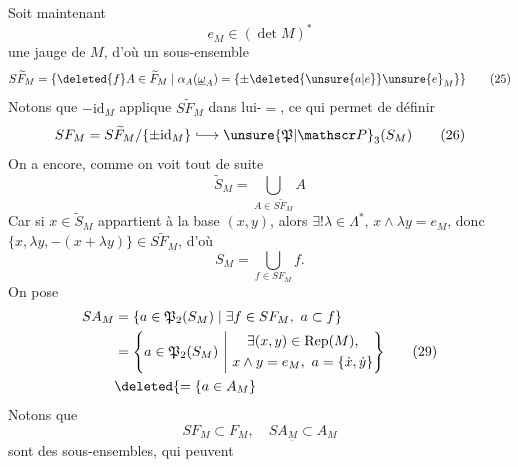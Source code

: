 Soit maintenant
\[
e_M\in(\det M)^*\tag*{(24)}
\]
une jauge de $M$, d'où un sous-ensemble
\[
S\widetilde F_M=\{\deleted{f}A\in\widetilde F_M\mid\alpha_A(\underline{\omega}_A)=\{\pm\deleted{\unsure{a|e}}\unsure{e}_M\}\}\tag*{(25)}
\]
Notons que $-\mathrm{id}_M$ applique $S\widetilde F_M$ dans lui-$=$, ce qui permet de définir
\[
SF_M=S\widetilde F_M/\{\pm\mathrm{id}_M\}\lhook\joinrel\longrightarrow\unsure{\mathfrak P|\mathscr P}_3(S_M)\tag*{(26)}
\]
On a encore, comme on voit tout de suite
\[
\widetilde S_M=\bigcup_{A\in S\widetilde F_M}A\tag*{(27)}
\]
Car si $x\in\widetilde S_M$ appartient à la base $(x,y)$, alors $\exists!\lambda\in\Lambda^*$,   $x\wedge\lambda y=e_M$, donc $\{x,\lambda y,-(x+\lambda y)\}\in S\widetilde F_M$, d'où
\[
S_M=\bigcup_{f\in SF_M}f.\tag*{(28)}
\]
On pose
\[
\begin{aligned}
SA_M&=\{a\in\mathfrak P_2(S_M)\mid\exists f\in SF_M,\ a\subset f\}\\
&=\left\{a\in\mathfrak P_2(S_M)\ \middle|\
\begin{gathered}\exists(x,y)\in\mathrm{Rep}(M),\\ x\wedge y=e_M,\ a=\{\dot x,\dot y\}\end{gathered}\right\}\\
&\deleted{=\{a\in A_M}
\end{aligned}\tag*{(29)}
\]
Notons que
\[
SF_M\subset F_M,\quad SA_{\underline M}\subset A_M\tag*{(30)}
\]
 sont des sous-ensembles, qui peuvent 
